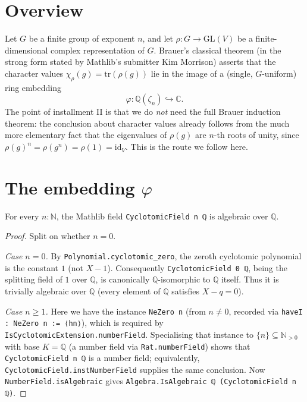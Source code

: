 


\section{Overview}

Let $G$ be a finite group of exponent $n$, and let $\rho : G \to \mathrm{GL}(V)$ be a finite-dimensional complex representation of $G$.  Brauer's classical theorem (in the strong form stated by Mathlib's submitter Kim Morrison) asserts that the character values $\chi_\rho(g) = \mathrm{tr}(\rho(g))$ lie in the image of a (single, $G$-uniform) ring embedding
\[
  \varphi : \mathbb{Q}(\zeta_n) \hookrightarrow \mathbb{C}.
\]
The point of installment II is that we do \emph{not} need the full Brauer induction theorem: the conclusion about character values already follows from the much more elementary fact that the eigenvalues of $\rho(g)$ are $n$-th roots of unity, since $\rho(g)^n = \rho(g^n) = \rho(1) = \mathrm{id}_V$.  This is the route we follow here.

\section{The embedding $\varphi$}

\begin{lemma}
  \label{lem:cyclotomic-algebraic}
  \leanok
  For every $n : \mathbb{N}$, the Mathlib field \verb|CyclotomicField n ℚ| is algebraic over $\mathbb{Q}$.
\end{lemma}
\begin{proof}
  Split on whether $n = 0$.

  \emph{Case $n = 0$.}  By \verb|Polynomial.cyclotomic_zero|, the zeroth cyclotomic polynomial is the constant $1$ (not $X - 1$).  Consequently \verb|CyclotomicField 0 ℚ|, being the splitting field of $1$ over $\mathbb{Q}$, is canonically $\mathbb{Q}$-isomorphic to $\mathbb{Q}$ itself.  Thus it is trivially algebraic over $\mathbb{Q}$ (every element of $\mathbb{Q}$ satisfies $X - q = 0$).

  \emph{Case $n \geq 1$.}  Here we have the instance \verb|NeZero n| (from $n \neq 0$, recorded via \verb|haveI : NeZero n := ⟨hn⟩|), which is required by \verb|IsCyclotomicExtension.numberField|.  Specialising that instance to $\{n\} \subseteq \mathbb{N}_{>0}$ with base $K = \mathbb{Q}$ (a number field via \verb|Rat.numberField|) shows that \verb|CyclotomicField n ℚ| is a number field; equivalently, \verb|CyclotomicField.instNumberField| supplies the same conclusion.  Now \verb|NumberField.isAlgebraic| gives \verb|Algebra.IsAlgebraic ℚ (CyclotomicField n ℚ)|.
\end{proof}

